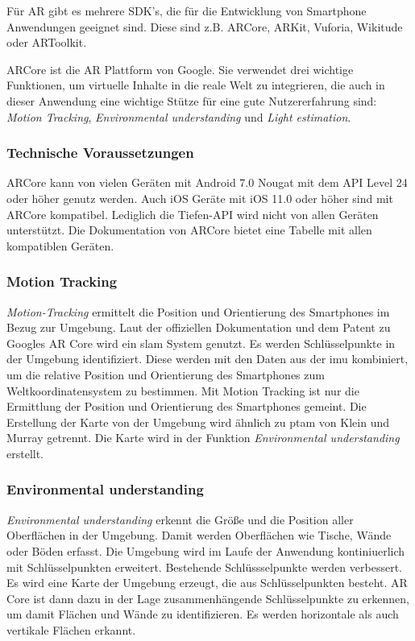 Für AR gibt es mehrere SDK's, die für die Entwicklung von Smartphone Anwendungen geeignet sind. Diese sind z.B. ARCore\cite*{ARCore}, ARKit\cite*{ARKit}, Vuforia\cite*{Vuforia}, Wikitude\cite*{Wikitude} oder ARToolkit\cite*{ARToolkit}.

ARCore ist die AR Plattform von Google. Sie verwendet drei wichtige Funktionen, um virtuelle Inhalte in die reale Welt zu integrieren, die auch in dieser Anwendung eine wichtige Stütze für eine gute Nutzererfahrung sind: \textit{Motion Tracking}, \textit{Environmental understanding} und \textit{Light estimation}.

\subsubsection{Technische Voraussetzungen}
\label{technische-umsetzung-arcore-voraussetzungen}
ARCore kann von vielen Geräten mit Android 7.0 Nougat mit dem API Level 24 oder höher genutz werden. Auch iOS Geräte mit iOS 11.0 oder höher sind mit ARCore kompatibel. Lediglich die Tiefen-API wird nicht von allen Geräten unterstützt. Die Dokumentation von ARCore\cite*{ARCoreDokumentation} bietet eine Tabelle mit allen kompatiblen Geräten.

\subsubsection{Motion Tracking}
\label{technische-umsetzung-arcore-motion-tracking}
\textit{Motion-Tracking} ermittelt die Position und Orientierung des Smartphones im Bezug zur Umgebung. Laut der offiziellen Dokumentation\cite{ARCoreDokumentation} und dem Patent zu Googles AR Core\cite[][]{esha2017} wird ein \acrshort{slam} System genutzt. Es werden Schlüsselpunkte in der Umgebung identifiziert. Diese werden mit den Daten aus der \acrshort{imu} kombiniert, um die relative Position und Orientierung des Smartphones zum Weltkoordinatensystem zu bestimmen. Mit Motion Tracking ist nur die Ermittlung der Position und Orientierung des Smartphones gemeint. Die Erstellung der Karte von der Umgebung wird ähnlich zu \acrshort{ptam} von Klein und Murray\cite*{klein2007} getrennt. Die Karte wird in der Funktion \textit{Environmental understanding} erstellt.

\subsubsection{Environmental understanding}
\label{technische-umsetzung-arcore-environmental-understanding}
\textit{Environmental understanding} erkennt die Größe und die Position aller Oberflächen in der Umgebung. Damit werden Oberflächen wie Tische, Wände oder Böden erfasst. Die Umgebung wird im Laufe der Anwendung kontiniuerlich mit Schlüsselpunkten erweitert. Bestehende Schlüssselpunkte werden verbessert. Es wird eine Karte der Umgebung erzeugt, die aus Schlüsselpunkten besteht. AR Core ist dann dazu in der Lage zusammenhängende Schlüsselpunkte zu erkennen, um damit Flächen und Wände zu identifizieren. Es werden horizontale als auch vertikale Flächen erkannt.

